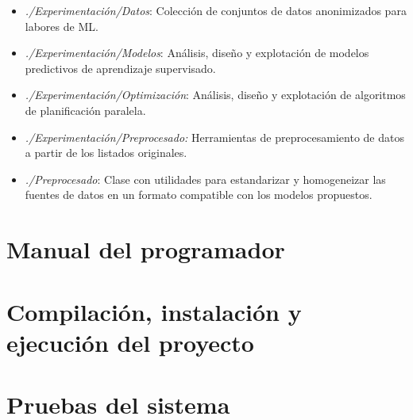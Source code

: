 \begin{itemize}
    \item \textit{./Experimentación/Datos}: Colección de conjuntos de datos anonimizados para labores de ML.
    \item \textit{./Experimentación/Modelos}: Análisis, diseño y explotación de modelos predictivos de aprendizaje supervisado.
    \item \textit{./Experimentación/Optimización}: Análisis, diseño y explotación de algoritmos de planificación paralela.
    \item \textit{./Experimentación/Preprocesado:} Herramientas de preprocesamiento de datos a partir de los listados originales.
    \item \textit{./Preprocesado}: Clase con utilidades para estandarizar y homogeneizar las fuentes de datos en un formato compatible con los modelos propuestos.
\end{itemize}


\section{Manual del programador}



\section{Compilación, instalación y ejecución del proyecto}

\section{Pruebas del sistema}


